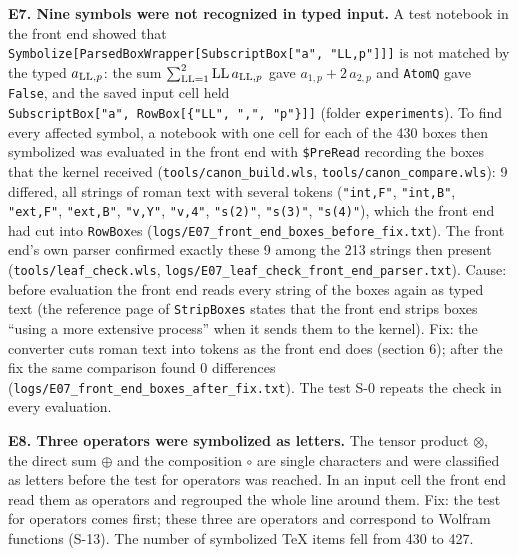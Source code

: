 \documentclass[
  10pt,
]{article}
\begin{document}
\textbf{E7. Nine symbols were not recognized in typed input.} A test
notebook in the front end showed that
\texttt{Symbolize{[}ParsedBoxWrapper{[}SubscriptBox{[}"a",\ "LL,p"{]}{]}{]}}
is not matched by the typed \(a_{{\rm LL},p}\): the sum
\(\sum_{{\rm LL}=1}^2{\rm LL}\,a_{{\rm LL},p}\) gave
\(a_{1,p}+2\,a_{2,p}\) and \texttt{AtomQ} gave \texttt{False}, and the
saved input cell held
\texttt{SubscriptBox{[}"a",\ RowBox{[}\{"LL",\ ",",\ "p"\}{]}{]}}
(folder \texttt{experiments}). To find every affected symbol, a notebook
with one cell for each of the 430 boxes then symbolized was evaluated in
the front end with \texttt{\$PreRead} recording the boxes that the
kernel received (\texttt{tools/canon\_build.wls},
\texttt{tools/canon\_compare.wls}): 9 differed, all strings of roman
text with several tokens (\texttt{"int,F"}, \texttt{"int,B"},
\texttt{"ext,F"}, \texttt{"ext,B"}, \texttt{"v,Y"}, \texttt{"v,4"},
\texttt{"s(2)"}, \texttt{"s(3)"}, \texttt{"s(4)"}), which the front end
had cut into \texttt{RowBox}es
(\texttt{logs/E07\_front\_end\_boxes\_before\_fix.txt}). The front end's
own parser confirmed exactly these 9 among the 213 strings then present
(\texttt{tools/leaf\_check.wls},
\texttt{logs/E07\_leaf\_check\_front\_end\_parser.txt}). Cause: before
evaluation the front end reads every string of the boxes again as typed
text (the reference page of \texttt{StripBoxes} states that the front
end strips boxes ``using a more extensive process'' when it sends them
to the kernel). Fix: the converter cuts roman text into tokens as the
front end does (section 6); after the fix the same comparison found 0
differences (\texttt{logs/E07\_front\_end\_boxes\_after\_fix.txt}). The
test S-0 repeats the check in every evaluation.

\textbf{E8. Three operators were symbolized as letters.} The tensor
product \(\otimes\), the direct sum \(\oplus\) and the composition
\(\circ\) are single characters and were classified as letters before
the test for operators was reached. In an input cell the front end read
them as operators and regrouped the whole line around them. Fix: the
test for operators comes first; these three are operators and correspond
to Wolfram functions (S-13). The number of symbolized TeX items fell
from 430 to 427.
\end{document}
